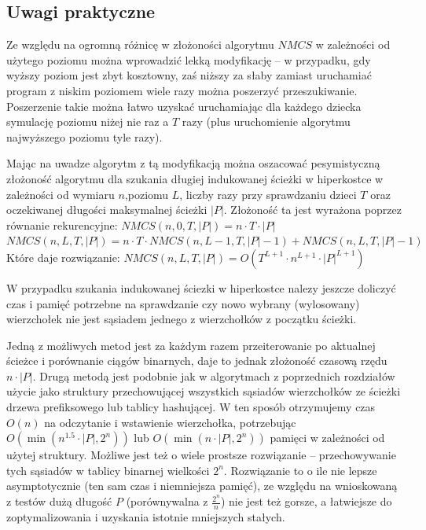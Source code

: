 \documentclass{pracamgr}
\begin{document}
    \subsection{Uwagi praktyczne}
     Ze względu na ogromną różnicę w złożoności algorytmu $NMCS$ w zależności od użytego poziomu można wprowadzić lekką modyfikację -- w przypadku,
     gdy wyższy poziom jest zbyt kosztowny, zaś niższy za słaby zamiast uruchamiać program z niskim poziomem wiele razy można poszerzyć przeszukiwanie.
     Poszerzenie takie można łatwo uzyskać uruchamiając dla każdego dziecka symulację poziomu niżej nie raz a $T$ razy
     (plus uruchomienie algorytmu najwyższego poziomu tyle razy).
     
     Mając na uwadze algorytm z tą modyfikacją można oszacować pesymistyczną złożoność algorytmu dla szukania długiej indukowanej ścieżki w hiperkostce
     w zależności od wymiaru $n$,poziomu $L$, liczby razy przy sprawdzaniu dzieci $T$ oraz oczekiwanej długości maksymalnej ścieżki $|P|$.
     Złożoność ta jest wyrażona poprzez równanie rekurencyjne:\newline
     $NMCS(n,0,T,|P|)=n\cdot T\cdot |P|$\newline
     $NMCS(n,L,T,|P|)=n\cdot T\cdot NMCS(n,L-1,T,|P|-1)+NMCS(n,L,T,|P|-1)$\newline
     Które daje rozwiązanie:\newline
     $NMCS(n,L,T,|P|)=O(T^{L+1}\cdot n^{L+1}\cdot|P|^{L+1})$     
     
     W przypadku szukania indukowanej ściezki w hiperkostce nalezy jeszcze doliczyć czas i pamięć potrzebne na sprawdzanie czy nowo wybrany (wylosowany)
     wierzchołek nie jest sąsiadem jednego z wierzchołków z początku ścieżki.
     
     Jedną z możliwych metod jest za każdym razem przeiterowanie po aktualnej ścieżce i porównanie ciągów binarnych, daje to jednak złożoność
     czasową rzędu $n\cdot |P|$. Drugą metodą jest podobnie jak w algorytmach z poprzednich rozdziałów użycie jako struktury przechowującej wszystkich sąsiadów
     wierzchołków ze ścieżki drzewa prefiksowego lub tablicy hashującej. W ten sposób otrzymujemy czas $O(n)$ na odczytanie i wstawienie wierzchołka,
     potrzebując $O(\min(n^{1.5}\cdot|P|,2^n))$ lub $O(\min(n\cdot|P|,2^n))$ pamięci w zależności od użytej struktury.
     Możliwe jest też o wiele prostsze rozwiązanie -- przechowywanie tych sąsiadów w tablicy binarnej wielkości $2^n$.
     Rozwiązanie to o ile nie lepsze asymptotycznie (ten sam czas i niemniejsza pamięć),
     ze względu na wnioskowaną z testów dużą długość $P$ (porównywalna z $\frac{2^n}{n}$) nie jest też gorsze,
     a łatwiejsze do zoptymalizowania i uzyskania istotnie mniejszych stałych.
     
\end{document}
